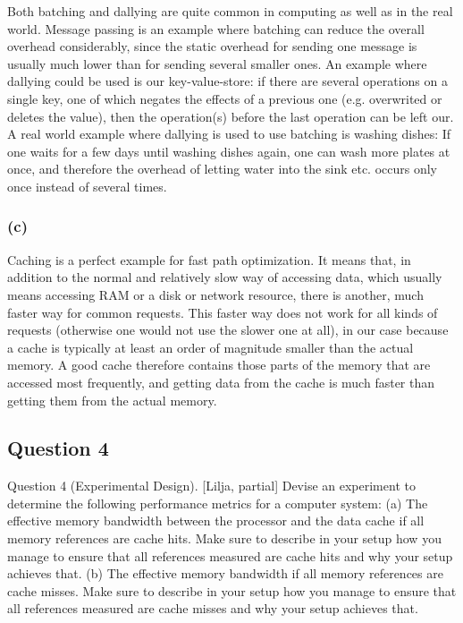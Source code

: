 \documentclass[12pt,a4paper]{article}
\begin{document}
Both batching and dallying are quite common in computing as well as in the real world. Message passing is an example where batching can reduce the overall overhead considerably, since the static overhead for sending one message is usually much lower than for sending several smaller ones. An example where dallying could be used is our key-value-store: if there are several operations on a single key, one of which negates the effects of a previous one (e.g. overwrited or deletes the value), then the operation(s) before the last operation can be left our. A real world example where dallying is used to use batching is washing dishes: If one waits for a few days until washing dishes again, one can wash more plates at once, and therefore the overhead of letting water into the sink etc. occurs only once instead of several times.

\subsubsection*{(c)}
Caching is a perfect example for fast path optimization. It means that, in addition to the normal and relatively slow way of accessing data, which usually means accessing RAM or a disk or network resource, there is another, much faster way for common requests. This faster way does not work for all kinds of requests (otherwise one would not use the slower one at all), in our case because a cache is typically at least an order of magnitude smaller than the actual memory. A good cache therefore contains those parts of the memory that are accessed most frequently, and getting data from the cache is much faster than getting them from the actual memory. 

\subsection*{Question 4}
\label{sec:eq4}
Question 4 (Experimental Design). [Lilja, partial] Devise an experiment to determine the following
performance metrics for a computer system:
(a) The effective memory bandwidth between the processor and the data cache if all memory
references are cache hits. Make sure to describe in your setup how you manage to ensure that all
references measured are cache hits and why your setup achieves that.
(b) The effective memory bandwidth if all memory references are cache misses. Make sure to
describe in your setup how you manage to ensure that all references measured are cache misses
and why your setup achieves that.
\end{document}
